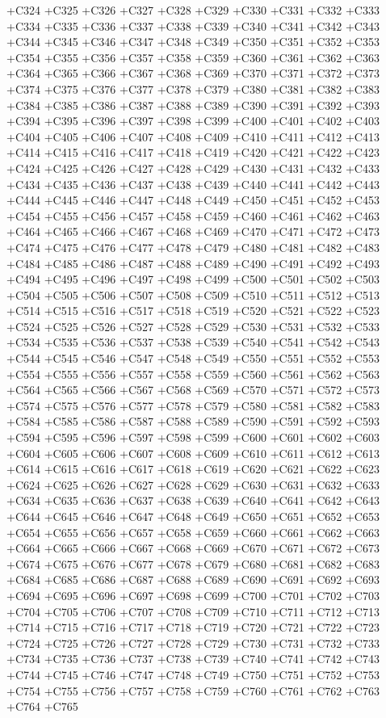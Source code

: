  +C324 +C325 +C326 +C327 +C328 +C329 +C330 +C331 +C332 +C333 +C334 +C335 +C336 +C337 +C338 +C339 +C340
 +C341 +C342 +C343 +C344 +C345 +C346 +C347 +C348 +C349 +C350 +C351 +C352 +C353 +C354 +C355 +C356 +C357
 +C358 +C359 +C360 +C361 +C362 +C363 +C364 +C365 +C366 +C367 +C368 +C369 +C370 +C371 +C372 +C373 +C374
 +C375 +C376 +C377 +C378 +C379 +C380 +C381 +C382 +C383 +C384 +C385 +C386 +C387 +C388 +C389 +C390 +C391
 +C392 +C393 +C394 +C395 +C396 +C397 +C398 +C399 +C400 +C401 +C402 +C403 +C404 +C405 +C406 +C407 +C408
 +C409 +C410 +C411 +C412 +C413 +C414 +C415 +C416 +C417 +C418 +C419 +C420 +C421 +C422 +C423 +C424 +C425
 +C426 +C427 +C428 +C429 +C430 +C431 +C432 +C433 +C434 +C435 +C436 +C437 +C438 +C439 +C440 +C441 +C442
 +C443 +C444 +C445 +C446 +C447 +C448 +C449 +C450 +C451 +C452 +C453 +C454 +C455 +C456 +C457 +C458 +C459
 +C460 +C461 +C462 +C463 +C464 +C465 +C466 +C467 +C468 +C469 +C470 +C471 +C472 +C473 +C474 +C475 +C476
 +C477 +C478 +C479 +C480 +C481 +C482 +C483 +C484 +C485 +C486 +C487 +C488 +C489 +C490 +C491 +C492 +C493
 +C494 +C495 +C496 +C497 +C498 +C499 +C500 +C501 +C502 +C503 +C504 +C505 +C506 +C507 +C508 +C509 +C510
 +C511 +C512 +C513 +C514 +C515 +C516 +C517 +C518 +C519 +C520 +C521 +C522 +C523 +C524 +C525 +C526 +C527
 +C528 +C529 +C530 +C531 +C532 +C533 +C534 +C535 +C536 +C537 +C538 +C539 +C540 +C541 +C542 +C543 +C544
 +C545 +C546 +C547 +C548 +C549 +C550 +C551 +C552 +C553 +C554 +C555 +C556 +C557 +C558 +C559 +C560 +C561
 +C562 +C563 +C564 +C565 +C566 +C567 +C568 +C569 +C570 +C571 +C572 +C573 +C574 +C575 +C576 +C577 +C578
 +C579 +C580 +C581 +C582 +C583 +C584 +C585 +C586 +C587 +C588 +C589 +C590 +C591 +C592 +C593 +C594 +C595
 +C596 +C597 +C598 +C599 +C600 +C601 +C602 +C603 +C604 +C605 +C606 +C607 +C608 +C609 +C610 +C611 +C612
 +C613 +C614 +C615 +C616 +C617 +C618 +C619 +C620 +C621 +C622 +C623 +C624 +C625 +C626 +C627 +C628 +C629
 +C630 +C631 +C632 +C633 +C634 +C635 +C636 +C637 +C638 +C639 +C640 +C641 +C642 +C643 +C644 +C645 +C646
 +C647 +C648 +C649 +C650 +C651 +C652 +C653 +C654 +C655 +C656 +C657 +C658 +C659 +C660 +C661 +C662 +C663
 +C664 +C665 +C666 +C667 +C668 +C669 +C670 +C671 +C672 +C673 +C674 +C675 +C676 +C677 +C678 +C679 +C680
 +C681 +C682 +C683 +C684 +C685 +C686 +C687 +C688 +C689 +C690 +C691 +C692 +C693 +C694 +C695 +C696 +C697
 +C698 +C699 +C700 +C701 +C702 +C703 +C704 +C705 +C706 +C707 +C708 +C709 +C710 +C711 +C712 +C713 +C714
 +C715 +C716 +C717 +C718 +C719 +C720 +C721 +C722 +C723 +C724 +C725 +C726 +C727 +C728 +C729 +C730 +C731
 +C732 +C733 +C734 +C735 +C736 +C737 +C738 +C739 +C740 +C741 +C742 +C743 +C744 +C745 +C746 +C747 +C748
 +C749 +C750 +C751 +C752 +C753 +C754 +C755 +C756 +C757 +C758 +C759 +C760 +C761 +C762 +C763 +C764 +C765
